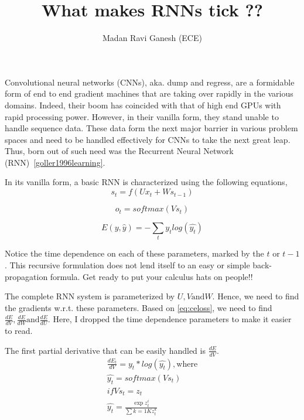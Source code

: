 \documentclass[10pt,onecolumn]{IEEEtran}
\title{What makes RNNs tick ??}
\author{Madan Ravi Ganesh (ECE)}
\begin{document}
\maketitle
\IEEEpeerreviewmaketitle
Convolutional neural networks (CNNs), aka. dump and regress, are a formidable form of end to end gradient machines that are taking over rapidly in the various domains. 
Indeed, their boom has coincided with that of high end GPUs with rapid processing power. 
However, in their vanilla form, they stand unable to handle sequence data. These data form the next major barrier in various problem spaces and need to be handled effectively for CNNs to take the next great leap.
Thus, born out of such need was the Recurrent Neural Network (RNN)~\ref{goller1996learning}. 


In its vanilla form, a basic RNN is characterized using the following equations,
\begin{equation}
s_t = f(Ux_t + Ws_{t-1})
\label{eq:hidstate}
\end{equation}

\begin{equation}
o_t = softmax(Vs_t)
\label{eq:output}
\end{equation}

\begin{equation}
E(y,\hat{y}) = -\sum_{t} y_t log(\hat{y_t})
\label{eq:celoss}
\end{equation}

Notice the time dependence on each of these parameters, marked by the $t$ or $t-1$. This recursive formulation does not lend itself to an easy or simple back-propagation formula. Get ready to put your calculus hats on people!!

The complete RNN system is parameterized by $U,V \text{and} W$. Hence, we need to find the gradients w.r.t. these parameters. 
Based on \ref{eq:celoss}, we need to find $\frac{dE}{dV}, \frac{dE}{dW} \text{and} \frac{dE}{dU}$. Here, I dropped the time dependence parameters to make it easier to read.

The first partial derivative that can be easily handled is $\frac{dE}{dV}$.
\begin{align*}
\frac{dE_t}{dV} = y_t * log(\hat{y_t}), \text{where} \\
\hat{y_t} = softmax(Vs_t) \\
if Vs_t = z_t \\
\hat{y_t} = \frac{\exp{z^{i}_t}}{\sum{k=1}{K}z^{k}_t} \\ 
\end{align*}
\end{document}
